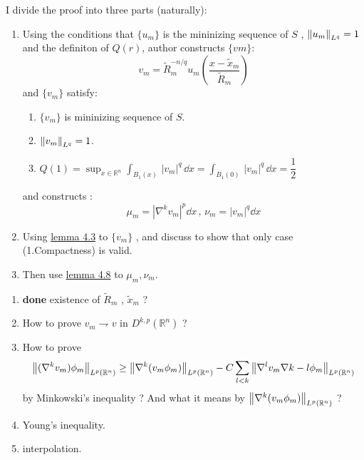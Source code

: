 \begin{theorem*}[4.9]\label{C1S4_4.9}
    
\end{theorem*}

\begin{remark*}
I divide the proof into three parts (naturally):
\begin{enumerate}
    \item {}
    Using the conditions that $\{u_m\}$ is the mininizing sequence of $S$ , $\norm{u_m}_{L^q}=1$ and the definiton of $Q(r)$, author constructs $\{vm\}$:
    \begin{equation*}
      v_m=
      \tilde{R}_m^{-n/q}
      u_m
      \left(
          \dfrac{x-\tilde{x}_m}
          {\tilde{R}_m}
      \right)      
    \end{equation*}
    and $\{v_m\}$ satisfy:
    \begin{enumerate}
    \item 
    $\{v_m\}$ is mininizing sequence of $S$.
    
    \item {}
    $\norm{v_m}_{L^q}=1$.

    \item {}
    $Q(1)=\sup_{x\in\mathbb{R}^n}
    \int_{B_1(x)}\,|v_m|^q\, \dd x
    =
    \int_{B_1(0)}\,|v_m|^q\,\dd x
    =
    \dfrac{1}{2}$
    \end{enumerate}
and constructs :
\begin{equation*}
    \mu_m=|\nabla^k v_m|^p\dd x\, , \, \nu_m=|v_m|^q\dd x
\end{equation*}

\item {}
Using \hyperlink{C1S4_4.3}{lemma 4.3} to $\{v_m\}$ , and discuss to show that only case (1.Compactness) is valid.

\item {}
Then use \hyperlink{C1S4_4.9}{lemma 4.8} to $\mu_m,\nu_m$.

\end{enumerate}
\end{remark*}

\question

\begin{enumerate}
\item {\bfseries done}%
existence of $\tilde{R}_m$ , $\tilde{x}_m$ ?
\item {}%
How to prove $v_m\rightharpoondown v$ in $D^{k,p}(\mathbb{R}^n)$ ?
\item {}%
How to prove 
\begin{equation*}
    \norm{(\nabla^k v_m)\phi_m}_{L^p(\mathbb{R}^n)}
    \geq
    \norm{\nabla^k(v_m\phi_m)}_{L^p(\mathbb{R}^n)}
    -
    C\sum_{l<k}
    \norm{\nabla^l v_m\nabla{k-l}\phi_m}_{L^p(\mathbb{R}^n)}
\end{equation*}
by Minkowski's inequality ? And what it means by $\norm{\nabla^k(v_m\phi_m)}_{L^p(\mathbb{R}^n)}$ ?

\item {}%
Young's inequality.

\item {}%
interpolation.
\end{enumerate}

